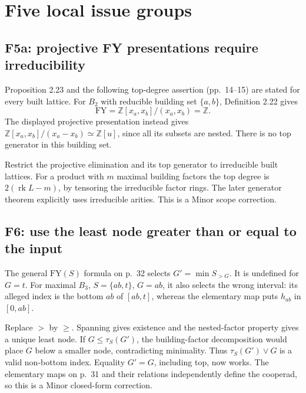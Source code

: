 \documentclass[10pt]{article}
\begin{document}
\section*{Five local issue groups}
\subsection*{F5a: projective FY presentations require irreducibility}
Proposition 2.23 and the following top-degree assertion (pp. 14–15) are stated for every built lattice. For \(B_2\) with reducible building set \(\{a,b\}\), Definition 2.22 gives \[\mathrm{FY}=\mathbb Z[x_a,x_b]/(x_a,x_b)=\mathbb Z.\] The displayed projective presentation instead gives \(\mathbb Z[x_a,x_b]/(x_a-x_b)\simeq\mathbb Z[u]\), since all its subsets are nested. There is no top generator in this building set.\par
Restrict the projective elimination and its top generator to irreducible built lattices. For a product with \(m\) maximal building factors the top degree is \(2(\operatorname{rk}L-m)\), by tensoring the irreducible factor rings. The later generator theorem explicitly uses irreducible arities. This is a Minor scope correction.\par
\subsection*{F6: use the least node greater than or equal to the input}
The general \(\mathrm{FY}(S)\) formula on p. 32 selects \(G'=\min S_{>G}\). It is undefined for \(G=t\). For maximal \(B_3\), \(S=\{ab,t\}\), \(G=ab\), it also selects the wrong interval: its alleged index is the bottom \(ab\) of \([ab,t]\), whereas the elementary map puts \(h_{ab}\) in \([0,ab]\).\par
Replace \(>\) by \(\geq\). Spanning gives existence and the nested-factor property gives a unique least node. If \(G\leq\tau_S(G')\), the building-factor decomposition would place \(G\) below a smaller node, contradicting minimality. Thus \(\tau_S(G')\vee G\) is a valid non-bottom index. Equality \(G'=G\), including top, now works. The elementary maps on p. 31 and their relations independently define the cooperad, so this is a Minor closed-form correction.\par
\end{document}
